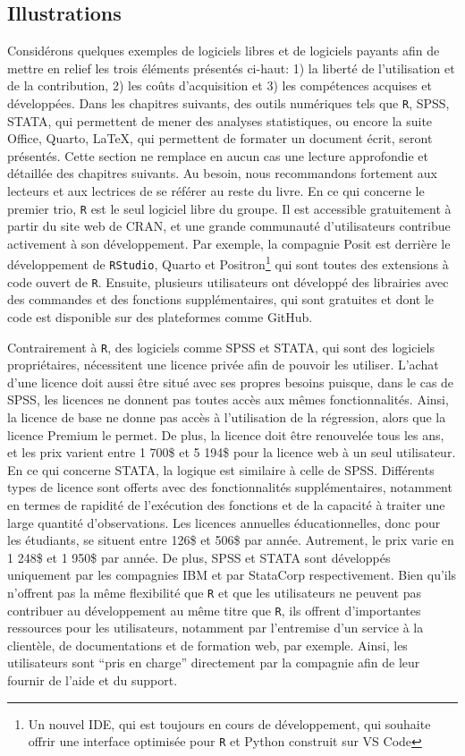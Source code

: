 \documentclass[
  letterpaper,
  DIV=11,
  numbers=noendperiod]{scrreprt}
\begin{document}
\subsection{Illustrations}\label{illustrations}

Considérons quelques exemples de logiciels libres et de logiciels
payants afin de mettre en relief les trois éléments présentés ci-haut:
1) la liberté de l'utilisation et de la contribution, 2) les coûts
d'acquisition et 3) les compétences acquises et développées. Dans les
chapitres suivants, des outils numériques tels que \texttt{R}, SPSS,
STATA, qui permettent de mener des analyses statistiques, ou encore la
suite Office, Quarto, LaTeX, qui permettent de formater un document
écrit, seront présentés. Cette section ne remplace en aucun cas une
lecture approfondie et détaillée des chapitres suivants. Au besoin, nous
recommandons fortement aux lecteurs et aux lectrices de se référer au
reste du livre. En ce qui concerne le premier trio, \texttt{R} est le
seul logiciel libre du groupe. Il est accessible gratuitement à partir
du site web de CRAN, et une grande communauté d'utilisateurs contribue
activement à son développement. Par exemple, la compagnie Posit est
derrière le développement de \texttt{RStudio}, Quarto et
Positron\footnote{Un nouvel IDE, qui est toujours en cours de
  développement, qui souhaite offrir une interface optimisée pour
  \texttt{R} et Python construit sur VS Code} qui sont toutes des
extensions à code ouvert de \texttt{R}. Ensuite, plusieurs utilisateurs
ont développé des librairies avec des commandes et des fonctions
supplémentaires, qui sont gratuites et dont le code est disponible sur
des plateformes comme GitHub.

Contrairement à \texttt{R}, des logiciels comme SPSS et STATA, qui sont
des logiciels propriétaires, nécessitent une licence privée afin de
pouvoir les utiliser. L'achat d'une licence doit aussi être situé avec
ses propres besoins puisque, dans le cas de SPSS, les licences ne
donnent pas toutes accès aux mêmes fonctionnalités. Ainsi, la licence de
base ne donne pas accès à l'utilisation de la régression, alors que la
licence Premium le permet. De plus, la licence doit être renouvelée tous
les ans, et les prix varient entre 1 700\$ et 5 194\$ pour la licence
web à un seul utilisateur. En ce qui concerne STATA, la logique est
similaire à celle de SPSS. Différents types de licence sont offerts avec
des fonctionnalités supplémentaires, notamment en termes de rapidité de
l'exécution des fonctions et de la capacité à traiter une large quantité
d'observations. Les licences annuelles éducationnelles, donc pour les
étudiants, se situent entre 126\$ et 506\$ par année. Autrement, le prix
varie en 1 248\$ et 1 950\$ par année. De plus, SPSS et STATA sont
développés uniquement par les compagnies IBM et par StataCorp
respectivement. Bien qu'ils n'offrent pas la même flexibilité que
\texttt{R} et que les utilisateurs ne peuvent pas contribuer au
développement au même titre que \texttt{R}, ils offrent d'importantes
ressources pour les utilisateurs, notamment par l'entremise d'un service
à la clientèle, de documentations et de formation web, par exemple.
Ainsi, les utilisateurs sont ``pris en charge'' directement par la
compagnie afin de leur fournir de l'aide et du support.
\end{document}
